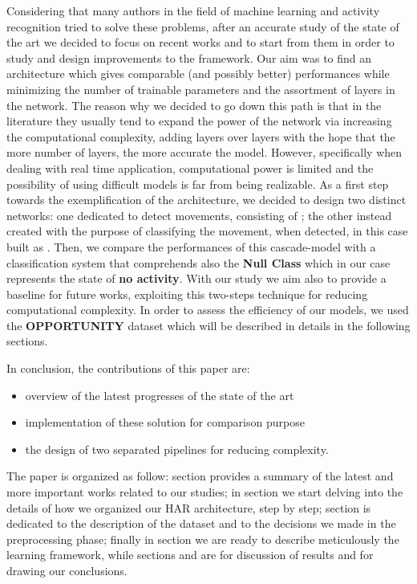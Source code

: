 Considering that many authors in the field of machine learning and activity recognition tried to solve these problems, after an accurate study of the state of the art we decided to focus on recent works and to start from them in order to study and design improvements to the framework. Our aim was to find an architecture which gives comparable (and possibly better) performances while minimizing the number of trainable parameters and the assortment of layers in the network. The reason why we decided to go down this path is that in the literature they usually tend to expand the power of the network via increasing the computational complexity, adding layers over layers with the hope that the more number of layers, the more accurate the model. However, specifically when dealing with real time application, computational power is limited and the possibility of using difficult models is far from being realizable. 
As a first step towards the exemplification of the architecture, we decided to design two distinct networks: one dedicated to detect movements, consisting of ; the other instead created with the purpose of classifying the movement, when detected, in this case built as . Then, we compare the performances of this cascade-model with a classification system that comprehends also the \textbf{Null Class} which in our case represents the state of \textbf{no activity}. With our study we aim also to provide a baseline for future works, exploiting this two-steps technique for reducing computational complexity. In order to assess the efficiency of our models, we used the \textbf{OPPORTUNITY} dataset \cite{Chavarriaga2013, ComplexAct-2010} which will be described in details in the following sections.

In conclusion, the contributions of this paper are:
\begin{itemize}
	\item overview of the latest progresses of the state of the art 
	\item implementation of these solution for comparison purpose
	\item the design of two separated pipelines for reducing complexity. 
\end{itemize}
 
The paper is organized as follow: section  provides a summary of the latest and more important works related to our studies; in section  we start delving into the details of how we organized our HAR architecture, step by step; section  is dedicated to the description of the dataset and to the decisions we made in the preprocessing phase; finally in section  we are ready to describe meticulously the learning framework, while sections  and  are for discussion of results and for drawing our conclusions. 